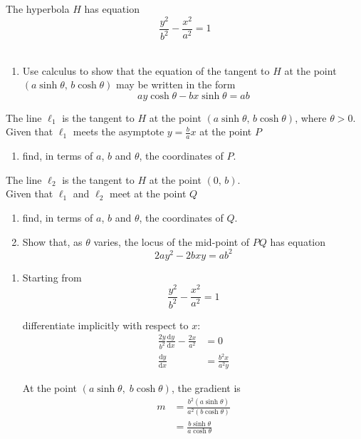\documentclass[leqno]{article}
\begin{document}
\begin{enumerate}[
  label=\textbf{\arabic*.},
  leftmargin=*,
  topsep=0pt,
  partopsep=0pt,
  parsep=0pt
]
The hyperbola $H$ has equation
\[
\frac{y^2}{b^2}-\frac{x^2}{a^2}=1
\] \\
\begin{enumerate}[label=\textbf{(\alph*)}]
  \item Use calculus to show that the equation of the tangent to $H$ at the point $(a\sinh\theta,\, b\cosh\theta)$ may be written in the form
  \[
  ay\cosh\theta-bx\sinh\theta=ab
  \]
\end{enumerate}
The line $\ell_1$ is the tangent to $H$ at the point $(a\sinh\theta,\, b\cosh\theta)$, where $\theta>0$. \\
Given that $\ell_1$ meets the asymptote $y=\frac{b}{a}x$ at the point $P$ \\
\begin{enumerate}[label=\textbf{(\alph*)}, resume]
  \item find, in terms of $a$, $b$ and $\theta$, the coordinates of $P$.  \\
\end{enumerate}
The line $\ell_2$ is the tangent to $H$ at the point $(0,\,b)$. \\
Given that $\ell_1$ and $\ell_2$ meet at the point $Q$ \\
\begin{enumerate}[label=\textbf{(\alph*)}, resume]
  \item find, in terms of $a$, $b$ and $\theta$, the coordinates of $Q$.  \\
  \item Show that, as $\theta$ varies, the locus of the mid-point of $PQ$ has equation
  \[
  2ay^2-2bxy=ab^2
  \]
\end{enumerate}

\vspace*{10pt}

\begin{djsSolution}
\begin{enumerate}[label=\textbf{(\alph*)}]
  \item Starting from
\[
\frac{y^2}{b^2}-\frac{x^2}{a^2}=1
\]

differentiate implicitly with respect to $x$:
\begin{align*}
\frac{2y}{b^2}\frac{\mathrm{d}y}{\mathrm{d}x}-\frac{2x}{a^2}&=0\\
\frac{\mathrm{d}y}{\mathrm{d}x}&=\frac{b^2x}{a^2y}
\end{align*}

At the point $(a\sinh\theta,\;b\cosh\theta)$, the gradient is
\begin{align*}
m&=\frac{b^2(a\sinh\theta)}{a^2(b\cosh\theta)}\\
&=\frac{b\sinh\theta}{a\cosh\theta}
\end{align*}


\end{enumerate}
\end{djsSolution}
\end{enumerate}
\end{document}

